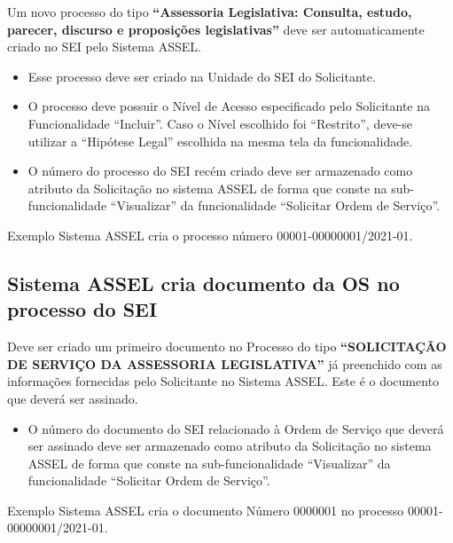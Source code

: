 	Um novo processo do tipo \textbf{``Assessoria Legislativa: Consulta, estudo, parecer, discurso e proposições legislativas''} deve ser automaticamente criado no SEI pelo Sistema ASSEL. 
	
	\begin{itemize}
		\item Esse processo deve ser criado na Unidade do SEI do Solicitante. 
		
		\item O processo deve possuir o Nível de Acesso especificado pelo Solicitante na Funcionalidade ``Incluir''. Caso o Nível escolhido foi ``Restrito'', deve-se 
		utilizar a ``Hipótese Legal'' escolhida na mesma tela da funcionalidade.
		
		\item O número do processo do SEI recém criado deve ser armazenado como atributo da Solicitação no sistema ASSEL  de forma que conste na sub-funcionalidade ``Visualizar'' da funcionalidade ``Solicitar Ordem de Serviço''.  
	\end{itemize}


	\begin{exemplo}[1]{Exemplo}
		Sistema ASSEL cria o processo número 00001-00000001/2021-01.
	\end{exemplo}
	
	
\subsection{Sistema ASSEL cria documento da OS no processo do SEI}

	Deve ser criado um primeiro documento no Processo do tipo \textbf{``SOLICITAÇÃO DE SERVIÇO DA ASSESSORIA LEGISLATIVA''} já preenchido com as informações fornecidas pelo Solicitante no Sistema ASSEL. Este é o documento que deverá ser assinado.
	
	
	\begin{itemize}
		\item O número do documento do SEI relacionado à Ordem de Serviço que deverá ser assinado deve ser armazenado como atributo da Solicitação no sistema ASSEL  de forma que conste na sub-funcionalidade ``Visualizar'' da funcionalidade ``Solicitar Ordem de Serviço''. 
	\end{itemize}

	\begin{exemplo}[1]{Exemplo}
		Sistema ASSEL cria o documento Número 0000001 no processo 00001-00000001/2021-01.
	\end{exemplo}


